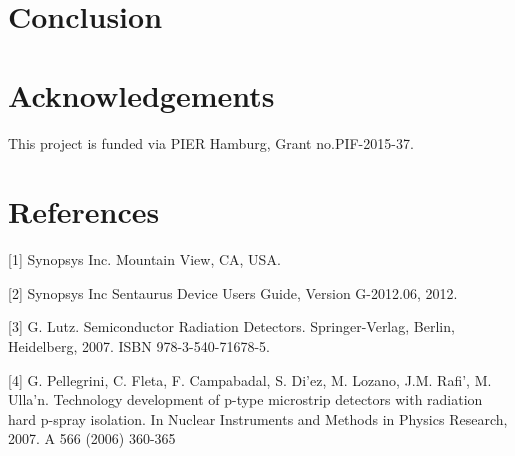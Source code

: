 \documentclass[a4paper,10pt]{article}
\newcommand*{\notFOREPJ}{}%
\begin{document}
\section{Conclusion}
\label{sec:conclusion}
\ifdefined\notFOREPJ
 
\else
 
\fi

\section*{Acknowledgements}
This project is funded via PIER Hamburg, Grant no.PIF-2015-37.

{\small
\section*{References}

[1] Synopsys Inc. Mountain View, CA, USA.

[2] Synopsys Inc Sentaurus Device Users Guide, Version G-2012.06, 2012.

[3] G. Lutz. Semiconductor Radiation Detectors. Springer-Verlag, Berlin, Heidelberg, 2007. ISBN 978-3-540-71678-5.

[4] G. Pellegrini, C. Fleta, F. Campabadal, S. Di'ez, M. Lozano, J.M. Rafi', M. Ulla'n. Technology development of p-type microstrip detectors with radiation hard p-spray isolation. In Nuclear Instruments and Methods in Physics Research, 2007. A 566 (2006) 360-365



\ifdefined\notFOREPJ

\else


\fi
}
\end{document}
